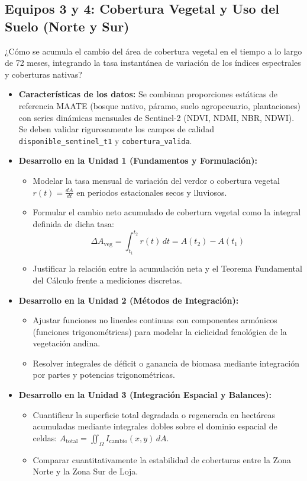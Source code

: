 \documentclass[11pt,a4paper]{article}
\begin{document}
\subsection{Equipos 3 y 4: Cobertura Vegetal y Uso del Suelo (Norte y Sur)}
\begin{guidelinebox}[title=Pregunta Guía Central]
¿Cómo se acumula el cambio del área de cobertura vegetal en el tiempo a lo largo de 72 meses, integrando la tasa instantánea de variación de los índices espectrales y coberturas nativas?
\end{guidelinebox}

\begin{itemize}[leftmargin=*,itemsep=1.5pt]
  \item \textbf{Características de los datos:} Se combinan proporciones estáticas de referencia MAATE (bosque nativo, páramo, suelo agropecuario, plantaciones) con series dinámicas mensuales de Sentinel-2 (NDVI, NDMI, NBR, NDWI). Se deben validar rigurosamente los campos de calidad \texttt{disponible\_sentinel\_t1} y \texttt{cobertura\_valida}.
  \item \textbf{Desarrollo en la Unidad 1 (Fundamentos y Formulación):}
  \begin{itemize}
    \item Modelar la tasa mensual de variación del verdor o cobertura vegetal $r(t) = \frac{dA}{dt}$ en periodos estacionales secos y lluviosos.
    \item Formular el cambio neto acumulado de cobertura vegetal como la integral definida de dicha tasa:
    \begin{equation*}
      \Delta A_{\text{veg}} = \int_{t_1}^{t_2} r(t)\,dt = A(t_2) - A(t_1)
    \end{equation*}
    \item Justificar la relación entre la acumulación neta y el Teorema Fundamental del Cálculo frente a mediciones discretas.
  \end{itemize}
  \item \textbf{Desarrollo en la Unidad 2 (Métodos de Integración):}
  \begin{itemize}
    \item Ajustar funciones no lineales continuas con componentes armónicos (funciones trigonométricas) para modelar la ciclicidad fenológica de la vegetación andina.
    \item Resolver integrales de déficit o ganancia de biomasa mediante integración por partes y potencias trigonométricas.
  \end{itemize}
  \item \textbf{Desarrollo en la Unidad 3 (Integración Espacial y Balances):}
  \begin{itemize}
    \item Cuantificar la superficie total degradada o regenerada en hectáreas acumuladas mediante integrales dobles sobre el dominio espacial de celdas: $A_{\text{total}} = \iint_{\Omega} I_{\text{cambio}}(x,y)\,dA$.
    \item Comparar cuantitativamente la estabilidad de coberturas entre la Zona Norte y la Zona Sur de Loja.
  \end{itemize}
\end{itemize}
\end{document}
